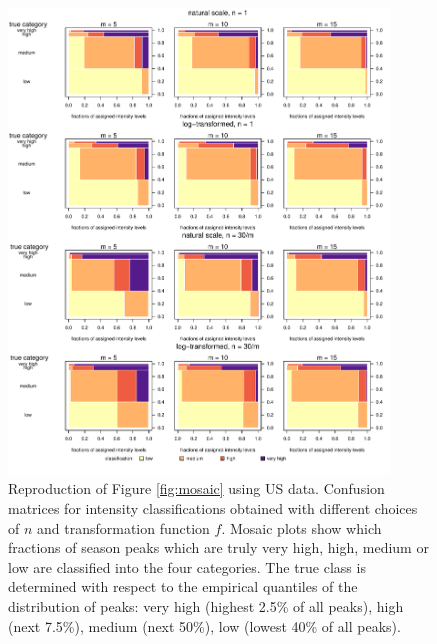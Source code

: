 \documentclass[12pt]{article}
\begin{document}
\begin{figure}[h!]
\includegraphics[width=0.9\textwidth]{figure/mosaic_us.pdf}
\caption{Reproduction of Figure \ref{fig:mosaic} using US data. Confusion matrices for intensity classifications obtained with different choices of $n$ and transformation function $f$. Mosaic plots show which fractions of season peaks which are truly very high, high, medium or low are classified into the four categories. The true class is determined with respect to the empirical quantiles of the distribution of peaks: very high (highest 2.5\% of all peaks), high (next 7.5\%), medium (next 50\%), low (lowest 40\% of all peaks).}
\label{fig:mosaic_us}
\end{figure}

\newpage 
\end{document}
